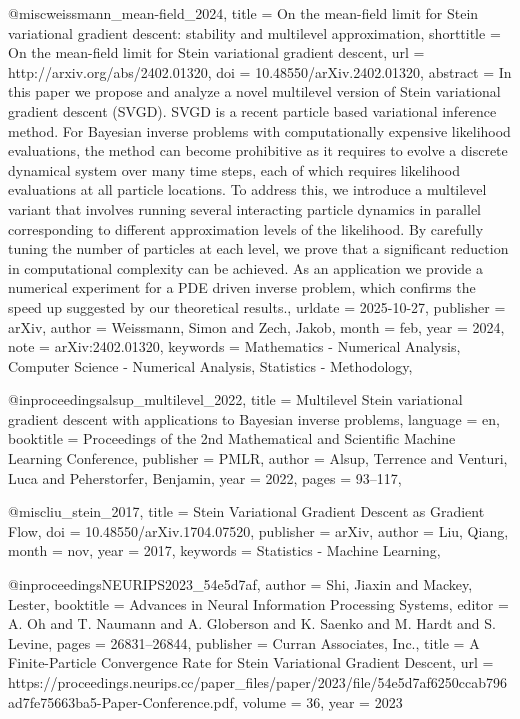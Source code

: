 @misc{weissmann_mean-field_2024,
	title = {On the mean-field limit for {Stein} variational gradient descent: stability and multilevel approximation},
	shorttitle = {On the mean-field limit for {Stein} variational gradient descent},
	url = {http://arxiv.org/abs/2402.01320},
	doi = {10.48550/arXiv.2402.01320},
	abstract = {In this paper we propose and analyze a novel multilevel version of Stein variational gradient descent (SVGD). SVGD is a recent particle based variational inference method. For Bayesian inverse problems with computationally expensive likelihood evaluations, the method can become prohibitive as it requires to evolve a discrete dynamical system over many time steps, each of which requires likelihood evaluations at all particle locations. To address this, we introduce a multilevel variant that involves running several interacting particle dynamics in parallel corresponding to different approximation levels of the likelihood. By carefully tuning the number of particles at each level, we prove that a significant reduction in computational complexity can be achieved. As an application we provide a numerical experiment for a PDE driven inverse problem, which confirms the speed up suggested by our theoretical results.},
	urldate = {2025-10-27},
	publisher = {arXiv},
	author = {Weissmann, Simon and Zech, Jakob},
	month = feb,
	year = {2024},
	note = {arXiv:2402.01320},
	keywords = {Mathematics - Numerical Analysis, Computer Science - Numerical Analysis, Statistics - Methodology},
}

@inproceedings{alsup_multilevel_2022,
	title = {Multilevel {Stein} variational gradient descent with applications to {Bayesian} inverse problems},
	language = {en},
	booktitle = {Proceedings of the 2nd {Mathematical} and {Scientific} {Machine} {Learning} {Conference}},
	publisher = {PMLR},
	author = {Alsup, Terrence and Venturi, Luca and Peherstorfer, Benjamin},
	year = {2022},
	pages = {93--117},
}

@misc{liu_stein_2017,
	title = {Stein {Variational} {Gradient} {Descent} as {Gradient} {Flow}},
	doi = {10.48550/arXiv.1704.07520},
	publisher = {arXiv},
	author = {Liu, Qiang},
	month = nov,
	year = {2017},
	keywords = {Statistics - Machine Learning},
}

@inproceedings{NEURIPS2023_54e5d7af,
 author = {Shi, Jiaxin and Mackey, Lester},
 booktitle = {Advances in Neural Information Processing Systems},
 editor = {A. Oh and T. Naumann and A. Globerson and K. Saenko and M. Hardt and S. Levine},
 pages = {26831--26844},
 publisher = {Curran Associates, Inc.},
 title = {A Finite-Particle Convergence Rate for Stein Variational Gradient Descent},
 url = {https://proceedings.neurips.cc/paper_files/paper/2023/file/54e5d7af6250ccab796ad7fe75663ba5-Paper-Conference.pdf},
 volume = {36},
 year = {2023}
}
